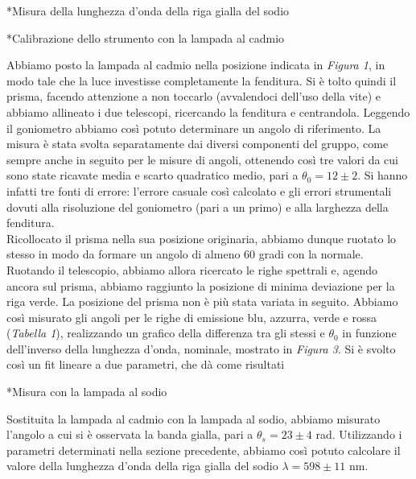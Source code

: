 \begin{section}*{Misura della lunghezza d'onda della riga gialla del sodio}

\begin{subsection}*{Calibrazione dello strumento con la lampada al cadmio}

Abbiamo posto la lampada al cadmio nella posizione indicata in \emph{Figura 1}, in modo tale che la luce investisse completamente la fenditura. Si è tolto quindi il prisma, facendo attenzione a non toccarlo (avvalendoci dell'uso della vite) e abbiamo allineato i due telescopi, ricercando la fenditura e centrandola. Leggendo il goniometro abbiamo così potuto determinare un angolo di riferimento. La misura è stata svolta separatamente dai diversi componenti del gruppo, come sempre anche in seguito per le misure di angoli, ottenendo così tre valori da cui sono state ricavate media e scarto quadratico medio, pari a $\theta_{0} = 12 \pm 2$. Si hanno infatti tre fonti di errore: l'errore casuale così calcolato e gli errori strumentali dovuti alla risoluzione del goniometro (pari a un primo) e alla larghezza della fenditura.\\ %
Ricollocato il prisma nella sua posizione originaria, abbiamo dunque ruotato lo stesso in modo da formare un angolo di almeno 60 gradi con la normale. Ruotando il telescopio, abbiamo allora ricercato le righe spettrali e, agendo ancora sul prisma, abbiamo raggiunto la posizione di minima deviazione per la riga verde. La posizione del prisma non è più stata variata in seguito. Abbiamo così misurato gli angoli per le righe di emissione blu, azzurra, verde e rossa (\emph{Tabella 1}), realizzando un grafico della differenza tra gli stessi e $\theta_{0}$ in funzione dell'inverso della lunghezza d'onda, nominale, mostrato in \emph{Figura 3}. Si è svolto così un fit lineare a due parametri, che dà come risultati  \\ %

\end{subsection}

\begin{subsection}*{Misura con la lampada al sodio}

Sostituita la lampada al cadmio con la lampada al sodio, abbiamo misurato l'angolo a cui si è osservata la banda gialla, pari a $\theta_{s} = 23 \pm 4$ rad. Utilizzando i parametri determinati nella sezione precedente, abbiamo così potuto calcolare il valore della lunghezza d'onda della riga gialla del sodio $\lambda = 598 \pm 11$ nm.

\end{subsection}

\end{section}


